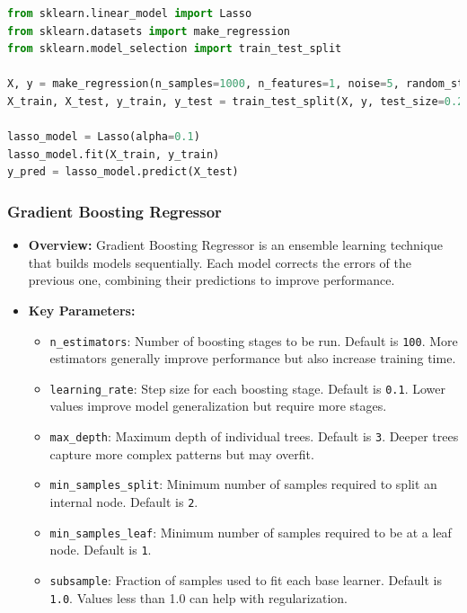 \begin{lstlisting}[language=Python, caption=Lasso Regression Example]
from sklearn.linear_model import Lasso
from sklearn.datasets import make_regression
from sklearn.model_selection import train_test_split

X, y = make_regression(n_samples=1000, n_features=1, noise=5, random_state=42)
X_train, X_test, y_train, y_test = train_test_split(X, y, test_size=0.2, random_state=42)

lasso_model = Lasso(alpha=0.1)
lasso_model.fit(X_train, y_train)
y_pred = lasso_model.predict(X_test)
\end{lstlisting}


\subsubsection*{Gradient Boosting Regressor}

\begin{itemize}
    \item \textbf{Overview:} Gradient Boosting Regressor is an ensemble learning technique that builds models sequentially. Each model corrects the errors of the previous one, combining their predictions to improve performance.
    \item \textbf{Key Parameters:}
    \begin{itemize}
        \item \texttt{n\_estimators}: Number of boosting stages to be run. Default is \texttt{100}. More estimators generally improve performance but also increase training time.
        \item \texttt{learning\_rate}: Step size for each boosting stage. Default is \texttt{0.1}. Lower values improve model generalization but require more stages.
        \item \texttt{max\_depth}: Maximum depth of individual trees. Default is \texttt{3}. Deeper trees capture more complex patterns but may overfit.
        \item \texttt{min\_samples\_split}: Minimum number of samples required to split an internal node. Default is \texttt{2}.
        \item \texttt{min\_samples\_leaf}: Minimum number of samples required to be at a leaf node. Default is \texttt{1}.
        \item \texttt{subsample}: Fraction of samples used to fit each base learner. Default is \texttt{1.0}. Values less than 1.0 can help with regularization.
    \end{itemize}
\end{itemize}

